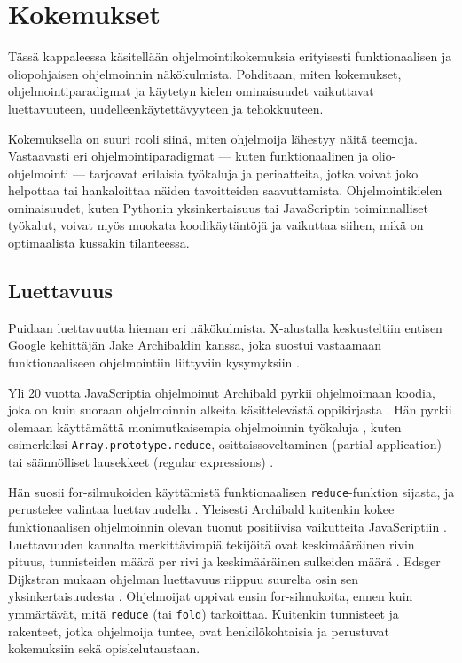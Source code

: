 \clearpage%
\vspace{21.5pt}
\chapter{Kokemukset}

Tässä kappaleessa käsitellään ohjelmointikokemuksia erityisesti funktionaalisen ja oliopohjaisen ohjelmoinnin näkökulmista. Pohditaan, miten kokemukset, ohjelmointiparadigmat ja käytetyn kielen ominaisuudet vaikuttavat luettavuuteen, uudelleenkäytettävyyteen ja tehokkuuteen.

Kokemuksella on suuri rooli siinä, miten ohjelmoija lähestyy näitä teemoja. Vastaavasti eri ohjelmointiparadigmat — kuten funktionaalinen ja olio-ohjelmointi — tarjoavat erilaisia työkaluja ja periaatteita, jotka voivat joko helpottaa tai hankaloittaa näiden tavoitteiden saavuttamista. Ohjelmointikielen ominaisuudet, kuten Pythonin yksinkertaisuus tai JavaScriptin toiminnalliset työkalut, voivat myös muokata koodikäytäntöjä ja vaikuttaa siihen, mikä on optimaalista kussakin tilanteessa.

\section{Luettavuus}

Puidaan luettavuutta hieman eri näkökulmista. X-alustalla keskusteltiin entisen Google kehittäjän Jake Archibaldin kanssa, joka suostui vastaamaan funktionaaliseen ohjelmointiin liittyviin kysymyksiin \cite{pennane_x_convo}.

Yli 20 vuotta JavaScriptia ohjelmoinut Archibald pyrkii ohjelmoimaan koodia, joka on kuin suoraan ohjelmoinnin alkeita käsittelevästä oppikirjasta \cite{is_reduce_bad,pennane_fp_gist}. Hän pyrkii olemaan käyttämättä monimutkaisempia ohjelmoinnin työkaluja \cite{is_reduce_bad}, kuten esimerkiksi \texttt{Array.prototype.reduce}, osittaissoveltaminen (partial application) tai säännölliset lausekkeet (regular expressions) \cite{is_reduce_bad,pennane_x_convo}.

Hän suosii for-silmukoiden käyttämistä funktionaalisen \texttt{reduce}-funktion sijasta, ja perustelee valintaa luettavuudella \cite{is_reduce_bad,pennane_x_convo,pennane_fp_gist}. Yleisesti Archibald kuitenkin kokee funktionaalisen ohjelmoinnin olevan tuonut positiivisa vaikutteita JavaScriptiin \cite{pennane_x_convo}. Luettavuuden kannalta merkittävimpiä tekijöitä ovat keskimääräinen rivin pituus, tunnisteiden määrä per rivi ja keskimääräinen sulkeiden määrä \cite[8]{busereadability}. Edsger Dijkstran mukaan ohjelman luettavuus riippuu suurelta osin sen  yksinkertaisuudesta \cite{dijkstra1976discipline}. Ohjelmoijat oppivat ensin for-silmukoita, ennen kuin ymmärtävät, mitä \texttt{reduce} (tai \texttt{fold}) tarkoittaa. Kuitenkin tunnisteet ja rakenteet, jotka ohjelmoija tuntee, ovat henkilökohtaisia ja perustuvat kokemuksiin sekä opiskelutaustaan.

